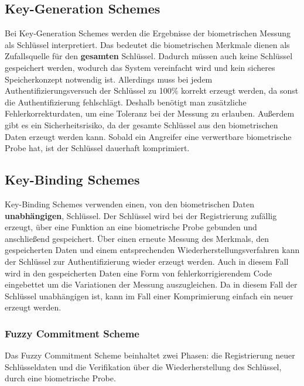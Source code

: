 \documentclass{article}
\begin{document}
    \subsection{Key-Generation Schemes}
    Bei Key-Generation Schemes werden die Ergebnisse der biometrischen Messung als Schlüssel interpretiert. Das bedeutet
    die biometrischen Merkmale dienen als Zufallsquelle für den \textbf{gesamten} Schlüssel. Dadurch müssen auch keine
    Schlüssel gespeichert werden, wodurch das System vereinfacht wird und kein sicheres Speicherkonzept notwendig ist.
    Allerdings muss bei jedem Authentifizierungsversuch der Schlüssel zu 100\% korrekt erzeugt werden, da sonst die 
    Authentifizierung fehlschlägt. Deshalb benötigt man zusätzliche Fehlerkorrekturdaten, um eine Toleranz bei der Messung
    zu erlauben. Außerdem gibt es ein Sicherheitsrisiko, da der gesamte Schlüssel aus den biometrischen Daten erzeugt werden
    kann. Sobald ein Angreifer eine verwertbare biometrische Probe hat, ist der Schlüssel dauerhaft komprimiert.
    \subsection{Key-Binding Schemes}
    Key-Binding Schemes verwenden einen, von den biometrischen Daten \textbf{unabhängigen}, Schlüssel. Der Schlüssel
    wird bei der Registrierung zufällig erzeugt, über eine Funktion an eine biometrische Probe gebunden und anschließend
    gespeichert. Über einen erneute Messung des Merkmals, den gespeicherten Daten und einem entsprechenden 
    Wiederherstellungsverfahren kann der Schlüssel zur Authentifizierung wieder erzeugt werden. Auch in diesem Fall
    wird in den gespeicherten Daten eine Form von fehlerkorrigierendem Code eingebettet um die Variationen 
    der Messung auszugleichen. Da in diesem Fall der Schlüssel unabhängigen ist, kann im Fall einer Komprimierung
    einfach ein neuer erzeugt werden. 
    \subsubsection{Fuzzy Commitment Scheme}
    Das Fuzzy Commitment Scheme beinhaltet zwei Phasen: die Registrierung neuer Schlüsseldaten und die Verifikation über
    die Wiederherstellung des Schlüssel, durch eine biometrische Probe.
\end{document}
